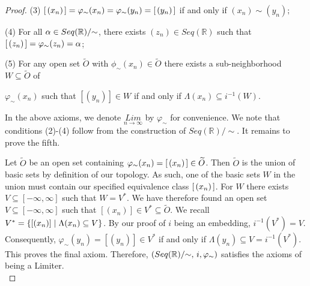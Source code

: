 \documentclass{amsart}
\theoremstyle{definition}
\theoremstyle{plain}
\begin{document}
\begin{proof}
\vspace{5mm}

\hspace{5mm} (3)  $[\hspace{0.5mm}(x_n)\hspace{0.5mm}] = \varphi_{\sim}(x_n) = \varphi_{\sim}(y_n) = [\hspace{0.5mm}(y_n)\hspace{0.5mm}]$ if and only if $(x_n) \sim (y_n);$

\vspace{5mm}

\hspace{5mm} (4) For all $\alpha \in Seq(\mathbb{R})/\hspace{-1mm}\sim$, there exists $(z_n) \in Seq(\mathbb{R})$ such that $[\hspace{0.5mm} (z_n) \hspace{0.5mm}] = \varphi_{\sim}(z_n) = \alpha$;

\vspace{5mm}

\hspace{5mm} (5) For any open set $\widetilde{O}$ with $\phi_{\sim}(x_n) \in \widetilde{O}$ there exists a sub-neighborhood $W \subseteq \widetilde{O}$ of 

\vspace{3mm}

\hspace{11mm} $\varphi_{\sim}(x_n)$ such that $[(y_n)] \in W$ if and only if $\Lambda(x_n) \subseteq i^{-1}(W).$

\vspace{7mm}

In the above axioms, we denote $\underset{n\to \infty}{Lim}$ by $\varphi_{\sim}$ for convenience. We note that conditions (2)-(4) follow from the construction of $Seq(\mathbb{R})/\sim$. It remains to prove the fifth. 

Let $\widetilde{O}$ be an open set containing 
$ \varphi_{\sim}(x_n) = [\hspace{0.5mm}(x_n)\hspace{0.5mm}] \in \widetilde{O}$. Then $\widetilde{O}$ is the union of basic sets by definition of our topology. As such, one of the basic sets $W$ in the union must contain our specified equivalence class $[\hspace{0.5mm}(x_n)\hspace{0.5mm}]$. For $W$ there exists $V \subseteq [-\infty,\infty]$ such that  $W=V^{*}$. We 
have therefore found an open set $V \subseteq [-\infty,\infty]$ such that $[(x_n)] \in V^* \subseteq \widetilde{O} $. 
We recall $V^* = \{[(x_n)] \hspace{1mm} | \hspace{1mm} \Lambda(x_n) \subseteq V \}$. By our proof of $i$ being 
an embedding, $i^{-1}(V^*) = V$. Consequently, $\varphi_{\sim}(y_n) = [(y_n)] \in V^* $ if and only if
$\Lambda(y_n) \subseteq V = i^{-1}(V^*)$. This proves the final axiom. Therefore, $(Seq(\mathbb{R})/\hspace{-1mm}\sim,\,i, \varphi_{\sim})$ satisfies the axioms of being a Limiter. \\



\end{proof}
\end{document}
